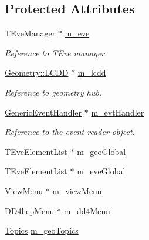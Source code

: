 \subsection*{Protected Attributes}
\begin{DoxyCompactItemize}
\item 
TEveManager $\ast$ \hyperlink{class_d_d4hep_1_1_display_a22aad63fdd7d2db0720957c9117ee794}{m\_\-eve}
\begin{DoxyCompactList}\small\item\em Reference to TEve manager. \item\end{DoxyCompactList}\item 
\hyperlink{class_d_d4hep_1_1_geometry_1_1_l_c_d_d}{Geometry::LCDD} $\ast$ \hyperlink{class_d_d4hep_1_1_display_a829bb86fd3460a74ca1da6c51e2802ef}{m\_\-lcdd}
\begin{DoxyCompactList}\small\item\em Reference to geometry hub. \item\end{DoxyCompactList}\item 
\hyperlink{class_d_d4hep_1_1_generic_event_handler}{GenericEventHandler} $\ast$ \hyperlink{class_d_d4hep_1_1_display_a7b83daeea2f4100c2ce0d92d0f417ed7}{m\_\-evtHandler}
\begin{DoxyCompactList}\small\item\em Reference to the event reader object. \item\end{DoxyCompactList}\item 
\hyperlink{class_t_eve_element_list}{TEveElementList} $\ast$ \hyperlink{class_d_d4hep_1_1_display_ad140be1ce0ad3e94e165623d66e16dca}{m\_\-geoGlobal}
\item 
\hyperlink{class_t_eve_element_list}{TEveElementList} $\ast$ \hyperlink{class_d_d4hep_1_1_display_a8d60b9f25c9907af4f9efa64363d8c85}{m\_\-eveGlobal}
\item 
\hyperlink{class_d_d4hep_1_1_view_menu}{ViewMenu} $\ast$ \hyperlink{class_d_d4hep_1_1_display_a363cb8c67d3fafa5a0847b3ad71dba05}{m\_\-viewMenu}
\item 
\hyperlink{class_d_d4hep_1_1_d_d4hep_menu}{DD4hepMenu} $\ast$ \hyperlink{class_d_d4hep_1_1_display_ac5b8a0eed40113e808530571cfe5b9ca}{m\_\-dd4Menu}
\item 
\hyperlink{class_d_d4hep_1_1_display_ab7cf442eb2211f57f55b7cd1cf8a61c1}{Topics} \hyperlink{class_d_d4hep_1_1_display_ade13a0eaa5fa83f5cf64f14ed7d3ef0d}{m\_\-geoTopics}
\item 

\end{DoxyCompactItemize}
